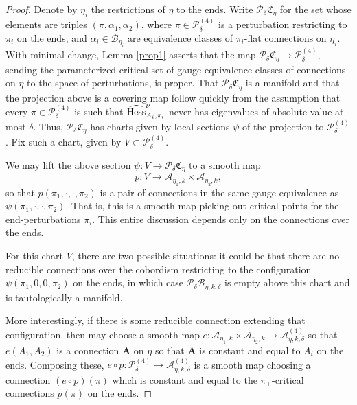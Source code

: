 \documentclass{memo-l}
\theoremstyle{definition}
\theoremstyle{remark}
\numberwithin{section}{chapter}
\numberwithin{equation}{chapter}
\begin{document}
\begin{proof}Denote by $\eta_i$ the restrictions of $\eta$ to the ends. Write $\mathcal P_\delta \mathfrak C_\eta$ for the set whose elements are triples $(\pi, \alpha_1, \alpha_2)$, where $\pi \in \mathcal P^{(4)}_\delta$ is a perturbation restricting to $\pi_i$ on the ends, and $\alpha_i \in \mathcal B_{\eta_i}$ are equivalence classes of $\pi_i$-flat connections on $\eta_i$. With minimal change, Lemma \ref{prop1} asserts that the map $\mathcal P_{\delta} \mathfrak C_\eta \to \mathcal P^{(4)}_{\delta}$, sending the parameterized critical set of gauge equivalence classes of connections on $\eta$ to the space of perturbations, is proper. That $\mathcal P_{\delta} \mathfrak C_\eta$ is a manifold and that the projection above is a covering map follow quickly from the assumption that every $\pi \in \mathcal P^{(4)}_{\delta}$ is such that $\widehat{\textup{Hess}}^\nu_{A_i, \pi_i}$ never has eigenvalues of absolute value at most $\delta$. Thus, $\mathcal P_{\delta} \mathfrak C_\eta$ has charts given by local sections $\psi$ of the projection to $\mathcal P^{(4)}_{\delta}$. Fix such a chart, given by $V \subset \mathcal P^{(4)}_{\delta}$.

We may lift the above section $\psi: V \to \mathcal P_{\delta} \mathfrak C_\eta$ to a smooth map
$$p: V \to \mathcal A_{\eta_1, k} \times \mathcal A_{\eta_2, k},$$
so that $p(\pi_1, \cdot, \cdot, \pi_2)$ is a pair of connections in the same gauge equivalence as $\psi(\pi_1, \cdot, \cdot, \pi_2)$. That is, this is a smooth map picking out critical points for the end-perturbations $\pi_i$. This entire discussion depends only on the connections over the ends.

For this chart $V$, there are two possible situations: it could be that there are no reducible connections over the cobordism restricting to the configuration $\psi(\pi_1, 0, 0, \pi_2)$ on the ends, in which case $\mathcal P_{\delta} \mathcal B_{\eta, k, \delta}$ is empty above this chart and is tautologically a manifold.

More interestingly, if there is some reducible connection extending that configuration, then may choose a smooth map $e: \mathcal A_{\eta_1, k} \times \mathcal A_{\eta_2, k} \to \mathcal A^{(4)}_{\eta, k,\delta}$ so that $e(A_1, A_2)$ is a connection $\mathbf{A}$ on $\eta$ so that $\mathbf{A}$ is constant and equal to $A_i$ on the ends. Composing these, $e \circ p: \mathcal P^{(4)}_{\delta} \to \mathcal A^{(4)}_{\eta, k, \delta}$ is a smooth map choosing a connection $(e\circ p)(\pi)$ which is constant and equal to the $\pi_\pm$-critical connections $p(\pi)$ on the ends.


\end{proof}
\end{document}
